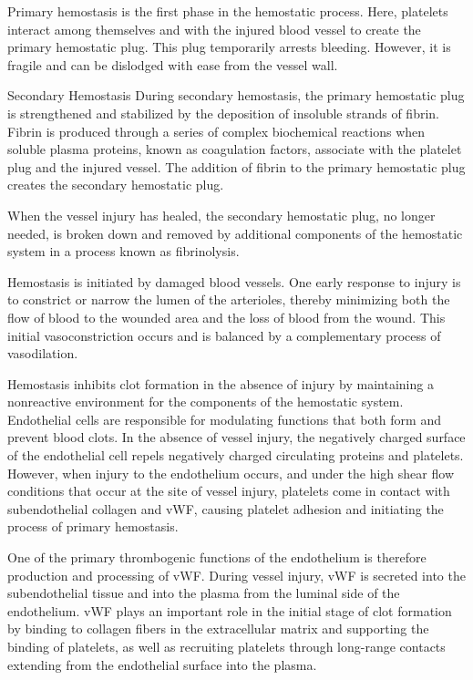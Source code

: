 Primary hemostasis is the first phase in the hemostatic process. Here, platelets interact among themselves and with the injured blood vessel to create the primary hemostatic plug. This plug temporarily arrests bleeding. However, it is fragile and can be dislodged with ease from the vessel wall.

Secondary Hemostasis
During secondary hemostasis, the primary hemostatic plug is strengthened and stabilized by the deposition of insoluble strands of fibrin. Fibrin is produced through a series of complex biochemical reactions when soluble plasma proteins, known as coagulation factors, associate with the platelet plug and the injured vessel. The addition of fibrin to the primary hemostatic plug creates the secondary hemostatic plug.

When the vessel injury has healed, the secondary hemostatic plug, no longer needed, is broken down and removed by additional components of the hemostatic system in a process known as fibrinolysis.

Hemostasis is initiated by damaged blood vessels. One early response to injury is to constrict or narrow the lumen of the arterioles, thereby minimizing both the flow of blood to the wounded area and the loss of blood from the wound. This initial vasoconstriction occurs and is balanced by a complementary process of vasodilation. 

Hemostasis inhibits clot formation in the absence of injury by maintaining a nonreactive environment for the components of the hemostatic system. Endothelial cells are responsible for modulating functions that both form and prevent blood clots. In the absence of vessel injury, the negatively charged surface of the endothelial cell repels negatively charged circulating proteins and platelets. However, when injury to the endothelium occurs, and under the high shear flow conditions that occur at the site of vessel injury, platelets come in contact with subendothelial collagen and vWF, causing platelet adhesion and initiating the process of primary hemostasis. 

One of the primary thrombogenic functions of the endothelium is therefore production and processing of vWF. During vessel injury, vWF is secreted into the subendothelial tissue and into the plasma from the luminal side of the endothelium. vWF plays an important role in the initial stage of clot formation by binding to collagen fibers in the extracellular matrix and supporting the binding of platelets, as well as recruiting platelets through long-range contacts extending from the endothelial surface into the plasma.




